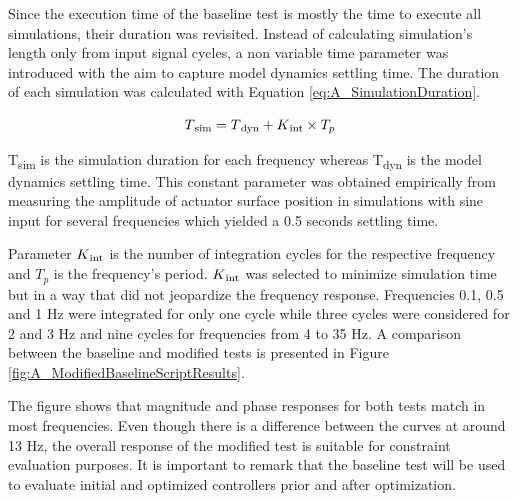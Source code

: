 Since the execution time of the baseline test is mostly the time to execute all simulations, their duration was revisited. Instead of calculating simulation's length only from input signal cycles, a non variable time parameter was introduced with the aim to capture model dynamics settling time. The duration of each simulation was calculated with Equation \ref{eq:A_SimulationDuration}.

\begin{equation}
\label{eq:A_SimulationDuration}
T\textsubscript{sim} = T\textsubscript{dyn} + K\textsubscript{int} \times T_p
\end{equation}

T\textsubscript{sim} is the simulation duration for each frequency whereas T\textsubscript{dyn} is the model dynamics settling time. This constant parameter was obtained empirically from measuring the amplitude of actuator surface position in simulations with sine input for several frequencies which yielded a 0.5 seconds settling time.

Parameter $K\textsubscript{int}$ is the number of integration cycles for the respective frequency and $T_p$ is the frequency's period. $K\textsubscript{int}$ was selected to minimize simulation time but in a way that did not jeopardize the frequency response. Frequencies 0.1, 0.5 and 1 Hz were integrated for only one cycle while three cycles were considered for 2 and 3 Hz and nine cycles for frequencies from 4 to 35 Hz. A comparison between the baseline and modified tests is presented in Figure \ref{fig:A_ModifiedBaselineScriptResults}.

The figure shows that magnitude and phase responses for both tests match in most frequencies. Even though there is a difference between the curves at around 13 Hz, the overall response of the modified test is suitable for constraint evaluation purposes. It is important to remark that the baseline test will be used to evaluate initial and optimized controllers prior and after optimization.

